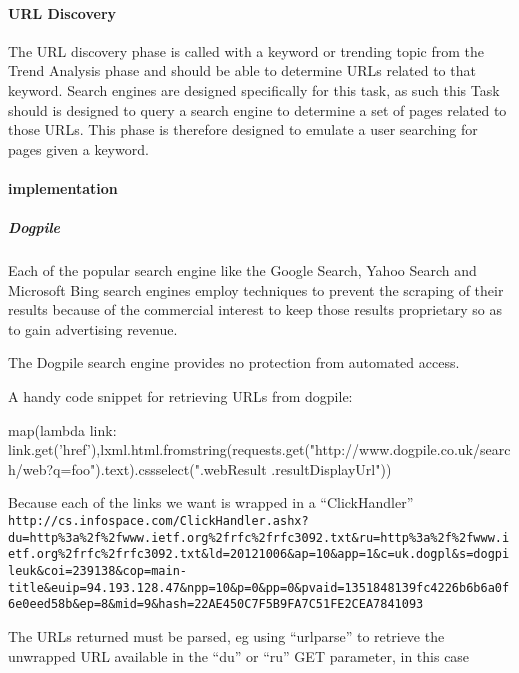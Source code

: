 \paragraph{URL Discovery}
The URL discovery phase is called with a keyword or trending topic from the Trend Analysis phase and should be able to determine URLs related to that keyword.  Search engines are designed specifically for this task, as such this Task should is designed to query a search engine to determine a set of pages related to those URLs. This phase is therefore designed to emulate a user searching for pages given a keyword.

\paragraph{implementation}
\subparagraph{Dogpile}
Each of the popular search engine like the Google Search, Yahoo Search and Microsoft Bing search engines employ techniques to prevent the scraping of their results because of the commercial interest to keep those results proprietary so as to gain advertising revenue.

The Dogpile search engine provides no protection from automated access.

A handy code snippet for retrieving URLs from dogpile:

map(lambda link: link.get('href'),lxml.html.fromstring(requests.get("http://www.dogpile.co.uk/search/web?q=foo").text).cssselect(".webResult .resultDisplayUrl"))

Because each of the links we want is wrapped in a ``ClickHandler'' \verb`http://cs.infospace.com/ClickHandler.ashx?du=http%3a%2f%2fwww.ietf.org%2frfc%2frfc3092.txt&ru=http%3a%2f%2fwww.ietf.org%2frfc%2frfc3092.txt&ld=20121006&ap=10&app=1&c=uk.dogpl&s=dogpileuk&coi=239138&cop=main-title&euip=94.193.128.47&npp=10&p=0&pp=0&pvaid=1351848139fc4226b6b6a0f6e0eed58b&ep=8&mid=9&hash=22AE450C7F5B9FA7C51FE2CEA7841093`

The URLs returned must be parsed, eg using ``urlparse'' to retrieve the unwrapped URL available in the ``du'' or ``ru'' GET parameter, in this case\cite{rfc3092}